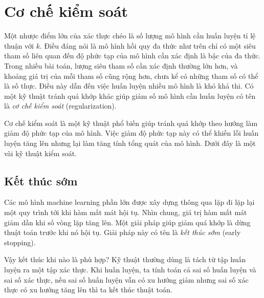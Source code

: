 \section{Cơ chế kiểm soát}

Một nhược điểm lớn của xác thực chéo là số lượng mô hình cần huấn luyện tỉ lệ
thuận với $k$. Điều đáng nói là mô hình hồi quy đa thức như trên chỉ có một siêu
tham số liên quan đến độ phức tạp của mô hình cần xác định là bậc của đa thức.
Trong nhiều bài toán, lượng siêu tham số cần xác định thường lớn hơn, và
khoảng giá trị của mỗi tham số cũng rộng hơn, chưa kể có những
tham số có thể là số thực. Điều này dẫn đến việc huấn luyện nhiều mô hình là khó
khả thi. Có một kỹ thuật tránh quá khớp khác giúp giảm số mô hình cần huấn
luyện có tên là \textit{cơ chế kiểm soát} (regularization).

{Cơ chế kiểm soát} là một kỹ thuật phổ biến giúp tránh quá khớp theo hướng làm
giảm độ phức tạp của mô hình. Việc giảm độ phức tạp này có thể khiến lỗi huấn
luyện tăng lên nhưng lại làm tăng tính tổng quát của mô hình. Dưới đây là một
vài kỹ thuật kiểm soát.

\subsection{Kết thúc sớm}
Các mô hình machine learning phần lớn được xây dựng thông qua lặp đi lặp lại một
quy trình tới khi hàm mất mát hội tụ. Nhìn chung, giá trị hàm mất mát giảm dần
khi số vòng lặp tăng lên. Một giải pháp giúp giảm quá khớp là dừng thuật toán
trước khi nó hội tụ. Giải pháp này có tên là \textit{kết thúc sớm} (early stopping).

Vậy kết thúc khi nào là phù hợp? Kỹ thuật thường dùng là tách từ tập huấn luyện ra
một tập xác thực. Khi huấn luyện, ta tính toán cả sai số huấn luyện và sai số
xác thực, nếu sai số huấn luyện vẫn có xu hướng giảm nhưng sai số xác thực có xu
hướng tăng lên thì ta kết thúc thuật toán.



